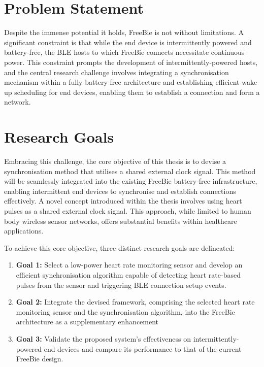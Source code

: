 \section{Problem Statement}
Despite the immense potential it holds, FreeBie is not without limitations. A significant constraint is that while the end device is intermittently powered and battery-free, the BLE hosts to which FreeBie connects necessitate continuous power. This constraint prompts the development of intermittently-powered hosts, and the central research challenge involves integrating a synchronisation mechanism within a fully battery-free architecture and establishing efficient wake-up scheduling for end devices, enabling them to establish a connection and form a network.

\section{Research Goals}
Embracing this challenge, the core objective of this thesis is to devise a synchronisation method that utilises a shared external clock signal. This method will be seamlessly integrated into the existing FreeBie battery-free infrastructure, enabling intermittent end devices to synchronise and establish connections effectively. A novel concept introduced within the thesis involves using heart pulses as a shared external clock signal. This approach, while limited to human body wireless sensor networks, offers substantial benefits within healthcare applications.

\noindent To achieve this core objective, three distinct research goals are delineated:

\begin{enumerate}
    \item \textbf{Goal 1:} Select a low-power heart rate monitoring sensor and develop an efficient synchronisation algorithm capable of detecting heart rate-based pulses from the sensor and triggering BLE connection setup events.
    
    \item \textbf{Goal 2:} Integrate the devised framework, comprising the selected heart rate monitoring sensor and the synchronisation algorithm, into the FreeBie architecture as a supplementary enhancement
    
    \item \textbf{Goal 3:} Validate the proposed system's effectiveness on intermittently-powered end devices and compare its performance to that of the current FreeBie design.

\end{enumerate}

